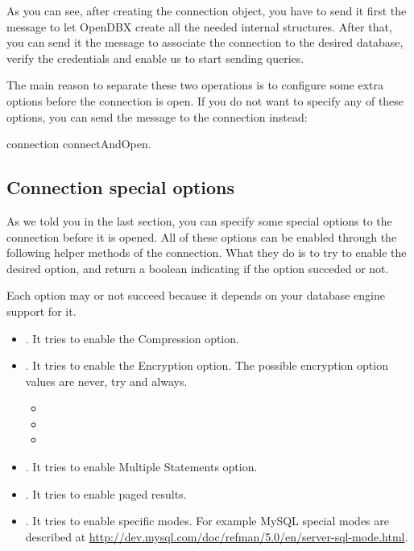 \documentclass[a4paper,10pt,twoside]{book}
\begin{document}
As you can see, after creating the connection object, you have to send it first the  message to let OpenDBX create all the needed internal structures.  After that, you can send it the  message to associate the connection to the desired database, verify the credentials and enable us to start sending queries.

The main reason to separate these two operations is to configure some extra options before the connection is open.  If you do not want to specify any of these options, you can send the  message to the connection instead:

\begin{code}{}
connection connectAndOpen.
\end{code}

\subsection{Connection special options}

As we told you in the last section, you can specify some special options to the connection before it is opened.  All of these options can be enabled through the following helper methods of the connection.  What they do is to try to enable the desired option, and return a boolean indicating if the option succeded or not.

Each option may or not succeed because it depends on your database engine support for it.

\begin{itemize}
\item {}. It tries to enable the Compression option.

\item {}. It tries to enable the Encryption option.  The possible encryption option values are never, try and always.
\begin{itemize}
    \item {}
    \item {}
    \item {}
\end{itemize}

\item {}. It tries to enable Multiple Statements option. 

\item {}. It tries to enable paged results.

\item {}.
	It tries to enable specific modes. For example MySQL special modes are described at \url{http://dev.mysql.com/doc/refman/5.0/en/server-sql-mode.html}.
\end{itemize}
\end{document}
